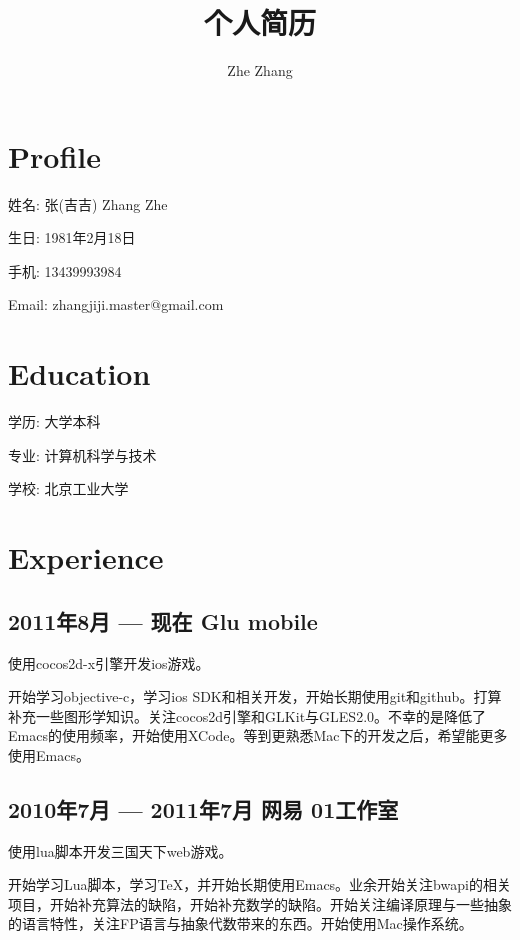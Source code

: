 \documentclass{article}
\begin{document}
\begin{CJK*}{UTF8}{gbsn}

\title{个人简历}
\author{Zhe Zhang}

\maketitle

\newpage

\section*{Profile}

姓名: 张(吉吉) Zhang Zhe

生日: 1981年2月18日

手机: 13439993984

Email: zhangjiji.master@gmail.com

\section*{Education}

学历: 大学本科

专业: 计算机科学与技术

学校: 北京工业大学

\section*{Experience}

\subsection*{2011年8月 --- 现在 \quad Glu mobile}

使用cocos2d-x引擎开发ios游戏。

开始学习objective-c，学习ios SDK和相关开发，开始长期使用git和github。打算补充一些图形学知识。关注cocos2d引擎和GLKit与GLES2.0。不幸的是降低了Emacs的使用频率，开始使用XCode。等到更熟悉Mac下的开发之后，希望能更多使用Emacs。

\subsection*{2010年7月 --- 2011年7月 \quad 网易 01工作室}

使用lua脚本开发三国天下web游戏。

开始学习Lua脚本，学习\TeX，并开始长期使用Emacs。业余开始关注bwapi的相关项目，开始补充算法的缺陷，开始补充数学的缺陷。开始关注编译原理与一些抽象的语言特性，关注FP语言与抽象代数带来的东西。开始使用Mac操作系统。


\end{CJK*}
\end{document}
